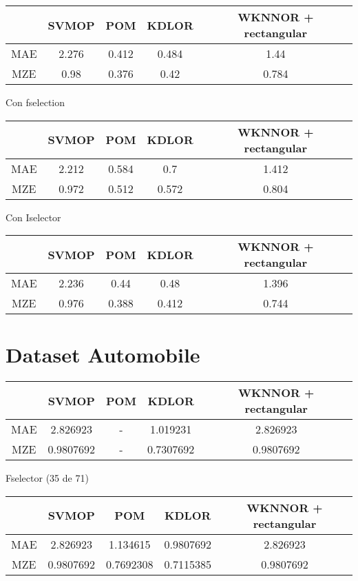 \begin{tabular}{ c c c c c }
	& SVMOP & POM & KDLOR & WKNNOR + rectangular \\
	\hline	
	MAE &   2.276  & 0.412 & 0.484 &  1.44  \\
	MZE &	0.98 & 0.376 & 0.42 & 0.784  \\
	\hline  
\end{tabular}

 Con fselection
 
 \begin{tabular}{ c c c c c }
 	& SVMOP & POM & KDLOR & WKNNOR + rectangular \\
 	\hline	
 	MAE &   2.212  & 0.584 & 0.7 &  1.412 \\
 	MZE &	0.972 & 0.512 & 0.572 & 0.804  \\
 	\hline  
 \end{tabular}

Con Iselector

 \begin{tabular}{ c c c c c }
	& SVMOP & POM & KDLOR & WKNNOR + rectangular \\
	\hline	
	MAE &   2.236  & 0.44 & 0.48 &  1.396 \\
	MZE &	0.976 & 0.388 & 0.412 & 0.744  \\
	\hline  
\end{tabular}

\section{Dataset Automobile}

\begin{tabular}{ c c c c c }
	& SVMOP & POM & KDLOR & WKNNOR + rectangular \\
	\hline	
	MAE &   2.826923  & - & 1.019231 &  2.826923 \\
	MZE &	0.9807692 & - & 0.7307692 & 0.9807692  \\
	\hline  
\end{tabular}

Fselector (35 de 71)

\begin{tabular}{ c c c c c }
	& SVMOP & POM & KDLOR & WKNNOR + rectangular \\
	\hline	
	MAE &   2.826923  & 1.134615 & 0.9807692 &  2.826923 \\
	MZE &	0.9807692 & 0.7692308 & 0.7115385 & 0.9807692  \\
	\hline  
\end{tabular}


